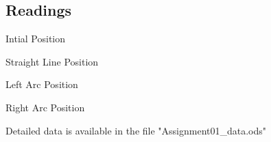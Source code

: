 \documentclass[10pt,a4paper]{article}
\begin{document}
				\subsection{Readings}
				\begin{table}[H]
					\centering
					
					\caption{Intial Position}
				\end{table}
				\begin{table}[H]
					\centering
					
					\caption{Straight Line Position}
				\end{table}
				\begin{table}[H]
					\centering
					
					\caption{Left Arc Position}
				\end{table}
				\begin{table}[H]
					\centering
					
					\caption{Right Arc Position}
				\end{table}
				Detailed data is available in the file "Assignment01\_data.ods"
\end{document}
